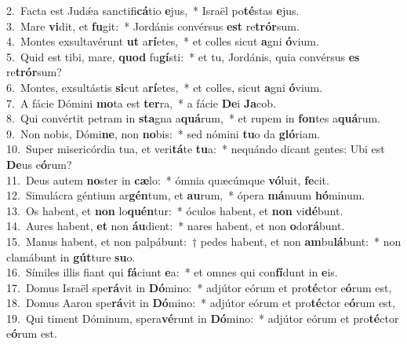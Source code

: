 {2.~}Facta est Judǽa sanctifi\textbf{cá}tio \textbf{e}jus,~* Israël po\textbf{té}stas \textbf{e}jus.\\
{3.~}Mare \textbf{vi}dit, et \textbf{fu}git:~* Jordánis convérsus \textbf{est} re\textbf{trór}sum.\\
{4.~}Montes exsultavérunt \textbf{ut} a\textbf{rí}etes,~* et colles sicut \textbf{a}gni \textbf{ó}vium.\\
{5.~}Quid est tibi, mare, \textbf{quod} fu\textbf{gí}sti:~* et tu, Jordánis, quia convérsus \textbf{es} re\textbf{trór}sum?\\
{6.~}Montes, exsultástis \textbf{si}cut a\textbf{rí}etes,~* et colles, sicut \textbf{a}gni \textbf{ó}vium.\\
{7.~}A fácie Dómini \textbf{mo}ta est \textbf{ter}ra,~* a fácie \textbf{De}i \textbf{Ja}cob.\\
{8.~}Qui convértit petram in \textbf{sta}gna a\textbf{quá}rum,~* et rupem in \textbf{fon}tes a\textbf{quá}rum.\\
{9.~}Non nobis, Dómi\textbf{ne}, non \textbf{no}bis:~* sed nómini \textbf{tu}o da \textbf{gló}riam.\\
{10.~}Super misericórdia tua, et veri\textbf{tá}te \textbf{tu}a:~* nequándo dicant gentes: Ubi est \textbf{De}us e\textbf{ó}rum?\\
{11.~}Deus autem \textbf{no}ster in \textbf{cæ}lo:~* ómnia quæcúmque \textbf{vó}luit, \textbf{fe}cit.\\
{12.~}Simulácra géntium ar\textbf{gén}tum, et \textbf{au}rum,~* ópera \textbf{má}nuum \textbf{hó}minum.\\
{13.~}Os habent, et \textbf{non} lo\textbf{quén}tur:~* óculos habent, et \textbf{non} vi\textbf{dé}bunt.\\
{14.~}Aures habent, \textbf{et} non \textbf{áu}dient:~* nares habent, et non \textbf{o}do\textbf{rá}bunt.\\
{15.~}Manus habent, et non palpábunt:~† pedes habent, et non \textbf{am}bu\textbf{lá}bunt:~* non clamábunt in \textbf{gút}ture \textbf{su}o.\\
{16.~}Símiles illis fiant qui \textbf{fá}ciunt \textbf{e}a:~* et omnes qui con\textbf{fí}dunt in \textbf{e}is.\\
{17.~}Domus Israël spe\textbf{rá}vit in \textbf{Dó}mino:~* adjútor eórum et pro\textbf{té}ctor e\textbf{ó}rum est,\\
{18.~}Domus Aaron spe\textbf{rá}vit in \textbf{Dó}mino:~* adjútor eórum et pro\textbf{té}ctor e\textbf{ó}rum est,\\
{19.~}Qui timent Dóminum, spera\textbf{vé}runt in \textbf{Dó}mino:~* adjútor eórum et pro\textbf{té}ctor e\textbf{ó}rum est.\\
